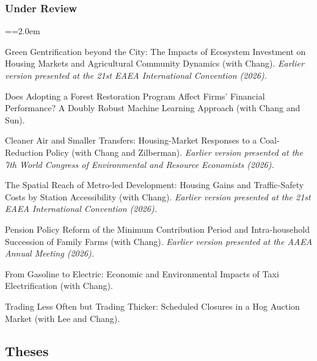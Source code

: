 \documentclass[11pt,letterpaper]{article}
\newenvironment{hanglist}{\par\setlength{\parindent}{0pt}\everypar={\hangindent=2.0em\hangafter=1}}{\par}
\begin{document}
\subsubsection{Under Review}\label{under-review}

\begin{hanglist}

Green Gentrification beyond the City: The Impacts
of Ecosystem Investment on Housing Markets and Agricultural Community
Dynamics (with Chang).
\newline \textit{Earlier version presented at the 21st EAEA International Convention (2026).}

Does Adopting a Forest Restoration Program Affect
Firms' Financial Performance? A Doubly Robust Machine Learning Approach
(with Chang and Sun).

Cleaner Air and Smaller Transfers: Housing-Market
Responses to a Coal-Reduction Policy (with Chang and Zilberman).
\newline \textit{Earlier version presented at the 7th World Congress of Environmental and Resource Economists (2026).}

The Spatial Reach of Metro-led Development:
Housing Gains and Traffic-Safety Costs by Station Accessibility (with
Chang).
\newline \textit{Earlier version presented at the 21st EAEA International Convention (2026).}

Pension Policy Reform of the Minimum Contribution
Period and Intra-household Succession of Family Farms (with Chang).
\newline \textit{Earlier version presented at the AAEA Annual Meeting (2026).}

From Gasoline to Electric: Economic and
Environmental Impacts of Taxi Electrification (with Chang).

Trading Less Often but Trading Thicker: Scheduled
Closures in a Hog Auction Market (with Lee and Chang).

\end{hanglist}

\subsection{Theses}\label{theses}
\end{document}
